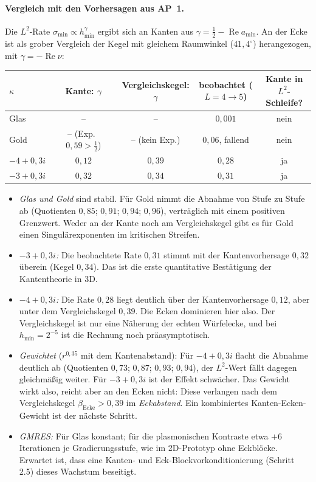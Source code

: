 \documentclass[11pt, a4paper]{article}
\begin{document}
\paragraph{Vergleich mit den Vorhersagen aus AP~1.} Die $L^2$-Rate
$\sigma_{\min}\propto h_{\min}^{\gamma}$ ergibt sich an Kanten aus
$\gamma=\tfrac12-\operatorname{Re}a_{\min}$. An der Ecke ist als grober Vergleich der Kegel
mit gleichem Raumwinkel ($41{,}4^\circ$) herangezogen, mit $\gamma=-\operatorname{Re}\nu$:
\begin{center}\small
\begin{tabular}{lcccc}
\toprule
$\kappa$ & Kante: $\gamma$ & Vergleichskegel: $\gamma$ & beobachtet ($L=4\to5$) & Kante in $L^2$-Schleife?\\
\midrule
Glas & -- & -- & $0{,}001$ & nein\\
Gold & -- (Exp.\ $0{,}59>\tfrac12$) & -- (kein Exp.) & $0{,}06$, fallend & nein\\
$-4+0{,}3i$ & $0{,}12$ & $0{,}39$ & $0{,}28$ & ja\\
$-3+0{,}3i$ & $0{,}32$ & $0{,}34$ & $0{,}31$ & ja\\
\bottomrule
\end{tabular}
\end{center}
\begin{itemize}[leftmargin=*]
  \item \emph{Glas und Gold} sind stabil. Für Gold nimmt die Abnahme von Stufe zu Stufe ab
    (Quotienten $0{,}85$; $0{,}91$; $0{,}94$; $0{,}96$), verträglich mit einem positiven
    Grenzwert. Weder an der Kante noch am Vergleichskegel gibt es für Gold einen
    Singulärexponenten im kritischen Streifen.
  \item \emph{$-3+0{,}3i$:} Die beobachtete Rate $0{,}31$ stimmt mit der Kantenvorhersage
    $0{,}32$ überein (Kegel $0{,}34$). Das ist die erste quantitative Bestätigung der
    Kantentheorie in 3D.
  \item \emph{$-4+0{,}3i$:} Die Rate $0{,}28$ liegt deutlich über der Kantenvorhersage
    $0{,}12$, aber unter dem Vergleichskegel $0{,}39$. Die Ecken dominieren hier also. Der
    Vergleichskegel ist nur eine Näherung der echten Würfelecke, und bei $h_{\min}=2^{-5}$
    ist die Rechnung noch präasymptotisch.
  \item \emph{Gewichtet} ($r^{0{,}35}$ mit dem Kantenabstand): Für $-4+0{,}3i$ flacht die
    Abnahme deutlich ab (Quotienten $0{,}73$; $0{,}87$; $0{,}93$; $0{,}94$), der
    $L^2$-Wert fällt dagegen gleichmäßig weiter. Für $-3+0{,}3i$ ist der Effekt schwächer.
    Das Gewicht wirkt also, reicht aber an den Ecken nicht: Diese verlangen nach dem
    Vergleichskegel $\beta_{\mathrm{Ecke}}>0{,}39$ im \emph{Eckabstand}. Ein kombiniertes
    Kanten-Ecken-Gewicht ist der nächste Schritt.
  \item \emph{GMRES:} Für Glas konstant; für die plasmonischen Kontraste etwa $+6$
    Iterationen je Gradierungsstufe, wie im 2D-Prototyp ohne Eckblöcke. Erwartet ist, dass
    eine Kanten- und Eck-Blockvorkonditionierung (Schritt 2.5) dieses Wachstum beseitigt.
\end{itemize}
\end{document}
